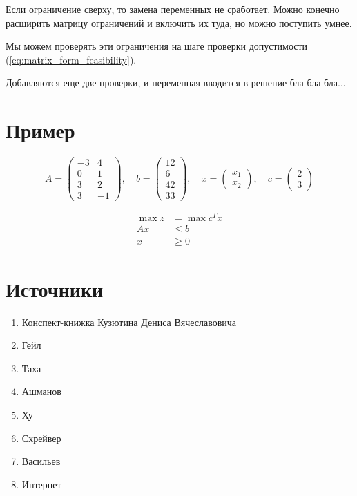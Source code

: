 \documentclass[a4paper,article,14pt]{extarticle}
\begin{document}
Если ограничение сверху, то замена переменных не сработает.
Можно конечно расширить матрицу ограничений и включить их туда, но можно поступить умнее.

Мы можем проверять эти ограничения на шаге проверки допустимости (\ref{eq:matrix_form_feasibility}).

Добавляются еще две проверки, и переменная вводится в решение бла бла бла...

\newpage

\section{Пример}

\begin{equation}
    A = \begin{pmatrix}
        -3 & 4 \\
        0 & 1 \\
        3 & 2 \\
        3 & -1
    \end{pmatrix}
    , \quad
    b =
    \begin{pmatrix}
        12 \\
        6 \\
        42 \\
        33
    \end{pmatrix}
    , \quad 
    x = \begin{pmatrix}
        x_1 \\ x_2
    \end{pmatrix}
    , \quad
    c = \begin{pmatrix}
        2 \\ 3
    \end{pmatrix}
\end{equation}

\begin{equation}
    \begin{aligned}
        \max z & = \max c^Tx \\
        Ax & \le b \\
        x & \ge 0
    \end{aligned}
\end{equation}

\newpage

\section{Источники}

\begin{enumerate}
    \item Конспект-книжка Кузютина Дениса Вячеславовича
    \item Гейл
    \item Таха
    \item Ашманов
    \item Ху
    \item Схрейвер
    \item Васильев
    \item Интернет
\end{enumerate}
\end{document}
